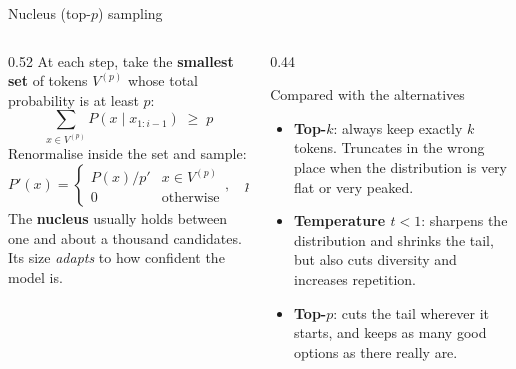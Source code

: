 \documentclass[aspectratio=169,11pt]{beamer}
\begin{document}
\begin{frame}{Nucleus (top-$p$) sampling}
  \begin{columns}[T]
    \begin{column}{0.52\textwidth}
      \small
      At each step, take the \textbf{smallest set} of tokens $V^{(p)}$ whose total probability is at least $p$:
      \[
        \sum_{x\in V^{(p)}}P(x\mid x_{1:i-1})\;\ge\;p
      \]
      Renormalise inside the set and sample:
      \[
        P'(x)=\begin{cases}P(x)/p' & x\in V^{(p)}\\ 0 & \text{otherwise}\end{cases},\quad p'=\sum_{x\in V^{(p)}}P(x)
      \]
      The \textbf{nucleus} usually holds between one and about a thousand candidates. Its size \emph{adapts} to how confident the model is.
    \end{column}
    \begin{column}{0.44\textwidth}
      \begin{block}{Compared with the alternatives}
        \small
        \begin{itemize}
          \item \textbf{Top-$k$}: always keep exactly $k$ tokens. Truncates in the wrong place when the distribution is very flat or very peaked.
          \item \textbf{Temperature $t<1$}: sharpens the distribution and shrinks the tail, but also cuts diversity and increases repetition.
          \item \textbf{Top-$p$}: cuts the tail wherever it starts, and keeps as many good options as there really are.
        \end{itemize}
      \end{block}
    \end{column}
  \end{columns}
\end{frame}
\end{document}
